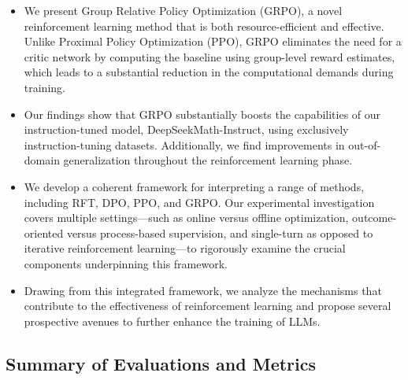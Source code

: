 \begin{itemize}[topsep=0pt]
    \item We present Group Relative Policy Optimization (GRPO), a novel reinforcement learning method that is both resource-efficient and effective. Unlike Proximal Policy Optimization (PPO), GRPO eliminates the need for a critic network by computing the baseline using group-level reward estimates, which leads to a substantial reduction in the computational demands during training.
    \item Our findings show that GRPO substantially boosts the capabilities of our instruction-tuned model, DeepSeekMath-Instruct, using exclusively instruction-tuning datasets. Additionally, we find improvements in out-of-domain generalization throughout the reinforcement learning phase.
    \item We develop a coherent framework for interpreting a range of methods, including RFT, DPO, PPO, and GRPO. Our experimental investigation covers multiple settings—such as online versus offline optimization, outcome-oriented versus process-based supervision, and single-turn as opposed to iterative reinforcement learning—to rigorously examine the crucial components underpinning this framework.
    \item Drawing from this integrated framework, we analyze the mechanisms that contribute to the effectiveness of reinforcement learning and propose several prospective avenues to further enhance the training of LLMs.
\end{itemize}

\subsection{Summary of Evaluations and Metrics}

